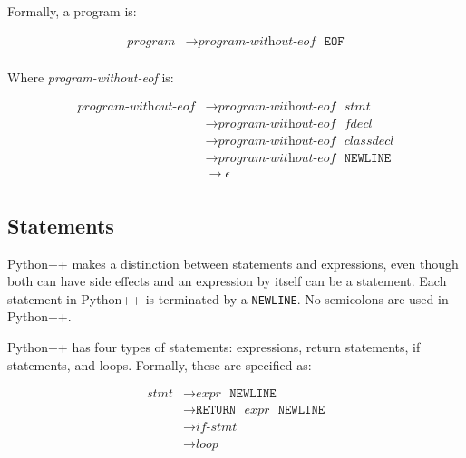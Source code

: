 \documentclass{article}
\begin{document}
Formally, a program is:

\label{sec:program}
\begin{align*}
    \textit{program} &\to \hyperref[sec:program-without-eof]{\textit{program-without-eof}} \texttt{ } \texttt{EOF} \\
\end{align*}

Where \textit{program-without-eof} is:

\label{sec:program-without-eof}
\begin{align*}
    \textit{program-without-eof} &\to \hyperref[sec:program-without-eof]{\textit{program-without-eof}} \texttt{ } \hyperref[sec:stmt]{\textit{stmt}} \\
    &\to \hyperref[sec:program-without-eof]{\textit{program-without-eof}} \texttt{ } \hyperref[sec:fdecl]{\textit{fdecl}} \\
    &\to \hyperref[sec:program-without-eof]{\textit{program-without-eof}} \texttt{ } \hyperref[sec:classdecl]{\textit{classdecl}} \\
    &\to \hyperref[sec:program-without-eof]{\textit{program-without-eof}} \texttt{ } \texttt{NEWLINE} \\
    &\to \epsilon \\
\end{align*}

\subsection{Statements}
Python++ makes a distinction between statements and expressions, even though both can have side effects and an expression by itself can be a statement. Each statement in Python++ is terminated by a \texttt{NEWLINE}. No semicolons are used in Python++.

Python++ has four types of statements: expressions, return statements, if statements, and loops. Formally, these are specified as:

\label{sec:stmt}
\begin{align*}
    \textit{stmt} &\to \hyperref[sec:expr]{\textit{expr}} \texttt{ } \texttt{NEWLINE} \\
    &\to \texttt{RETURN} \texttt{ } \hyperref[sec:expr]{\textit{expr}} \texttt{ } \texttt{NEWLINE} \\
    &\to \hyperref[sec:if-stmt]{\textit{if-stmt}} \\
    &\to \hyperref[sec:loop]{\textit{loop}} \\
\end{align*}
\end{document}
